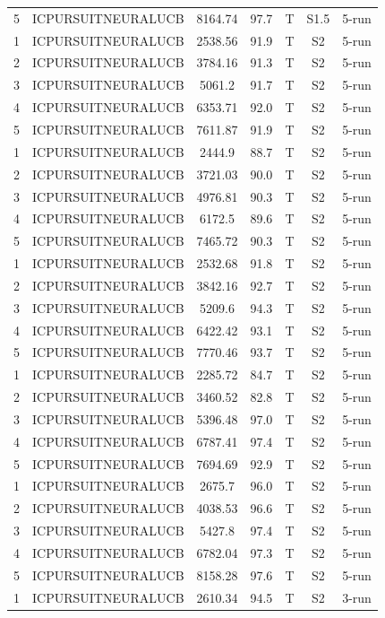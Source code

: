 \documentclass[11pt]{article}
\begin{document}
\begin{center}
\begin{longtable}{|c|c|c|c|c|c|c|}
5 & ICPURSUITNEURALUCB & 8164.74 & 97.7 & T & S1.5 & 5-run \\
1 & ICPURSUITNEURALUCB & 2538.56 & 91.9 & T & S2 & 5-run \\
2 & ICPURSUITNEURALUCB & 3784.16 & 91.3 & T & S2 & 5-run \\
3 & ICPURSUITNEURALUCB & 5061.2 & 91.7 & T & S2 & 5-run \\
4 & ICPURSUITNEURALUCB & 6353.71 & 92.0 & T & S2 & 5-run \\
5 & ICPURSUITNEURALUCB & 7611.87 & 91.9 & T & S2 & 5-run \\
1 & ICPURSUITNEURALUCB & 2444.9 & 88.7 & T & S2 & 5-run \\
2 & ICPURSUITNEURALUCB & 3721.03 & 90.0 & T & S2 & 5-run \\
3 & ICPURSUITNEURALUCB & 4976.81 & 90.3 & T & S2 & 5-run \\
4 & ICPURSUITNEURALUCB & 6172.5 & 89.6 & T & S2 & 5-run \\
5 & ICPURSUITNEURALUCB & 7465.72 & 90.3 & T & S2 & 5-run \\
1 & ICPURSUITNEURALUCB & 2532.68 & 91.8 & T & S2 & 5-run \\
2 & ICPURSUITNEURALUCB & 3842.16 & 92.7 & T & S2 & 5-run \\
3 & ICPURSUITNEURALUCB & 5209.6 & 94.3 & T & S2 & 5-run \\
4 & ICPURSUITNEURALUCB & 6422.42 & 93.1 & T & S2 & 5-run \\
5 & ICPURSUITNEURALUCB & 7770.46 & 93.7 & T & S2 & 5-run \\
1 & ICPURSUITNEURALUCB & 2285.72 & 84.7 & T & S2 & 5-run \\
2 & ICPURSUITNEURALUCB & 3460.52 & 82.8 & T & S2 & 5-run \\
3 & ICPURSUITNEURALUCB & 5396.48 & 97.0 & T & S2 & 5-run \\
4 & ICPURSUITNEURALUCB & 6787.41 & 97.4 & T & S2 & 5-run \\
5 & ICPURSUITNEURALUCB & 7694.69 & 92.9 & T & S2 & 5-run \\
1 & ICPURSUITNEURALUCB & 2675.7 & 96.0 & T & S2 & 5-run \\
2 & ICPURSUITNEURALUCB & 4038.53 & 96.6 & T & S2 & 5-run \\
3 & ICPURSUITNEURALUCB & 5427.8 & 97.4 & T & S2 & 5-run \\
4 & ICPURSUITNEURALUCB & 6782.04 & 97.3 & T & S2 & 5-run \\
5 & ICPURSUITNEURALUCB & 8158.28 & 97.6 & T & S2 & 5-run \\
1 & ICPURSUITNEURALUCB & 2610.34 & 94.5 & T & S2 & 3-run \\

\end{longtable}
\end{center}
\end{document}
